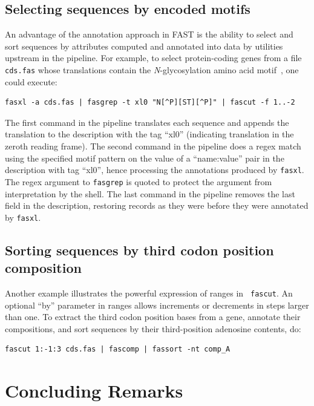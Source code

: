 \documentclass{frontiersSCNS} %
\begin{document}
\subsection{Selecting sequences by encoded motifs }

An advantage of the annotation approach in FAST is the ability to
select and sort sequences by attributes computed and annotated into
data by utilities upstream in the pipeline. For example, to select
protein-coding genes from a file {\tt cds.fas} whose translations
contain the {\it N}-glycosylation amino acid
motif~\citep{KornfieldKornfield85}, one could execute:

\begin{verbatim}
fasxl -a cds.fas | fasgrep -t xl0 "N[^P][ST][^P]" | fascut -f 1..-2
\end{verbatim}
 
The first command in the pipeline translates each sequence and appends
the translation to the description with the tag ``xl0'' (indicating
translation in the zeroth reading frame). The second command in the
pipeline does a regex match using the specified motif pattern on the
value of a ``name:value'' pair in the description with tag ``xl0'',
hence processing the annotations produced by {\tt fasxl}. The regex
argument to {\tt fasgrep} is quoted to protect the argument from
interpretation by the shell. The last command in the pipeline removes
the last field in the description, restoring records as they were
before they were annotated by {\tt fasxl}.

\subsection{Sorting sequences by third codon position composition}

Another example illustrates the powerful expression of ranges in {\tt
  fascut}. An optional ``by'' parameter in ranges allows increments or
decrements in steps larger than one. To extract the third codon
position bases from a gene, annotate their compositions, and sort
sequences by their third-position adenosine contents, do:

\begin{verbatim}
fascut 1:-1:3 cds.fas | fascomp | fassort -nt comp_A
\end{verbatim}

\section{Concluding Remarks}
\end{document}
